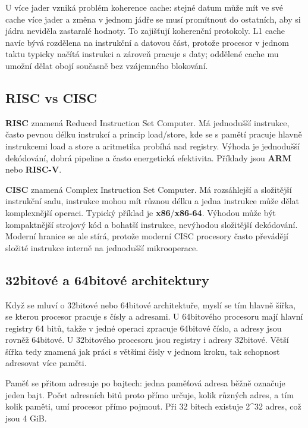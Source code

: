 \documentclass[11pt,a4paper]{article}
\begin{document}
U více jader vzniká problém koherence cache: stejné datum může mít ve své cache více jader a změna v jednom jádře se musí promítnout do ostatních, aby si jádra neviděla zastaralé hodnoty. To zajišťují koherenční protokoly. L1 cache navíc bývá rozdělena na instrukční a datovou část, protože procesor v jednom taktu typicky načítá instrukci a zároveň pracuje s daty; oddělené cache mu umožní dělat obojí současně bez vzájemného blokování.

\subsection*{RISC vs CISC}

\textbf{RISC} znamená Reduced Instruction Set Computer. Má jednodušší instrukce, často pevnou délku instrukcí a princip load/store, kde se s pamětí pracuje hlavně instrukcemi load a store a aritmetika probíhá nad registry. Výhoda je jednodušší dekódování, dobrá pipeline a často energetická efektivita. Příklady jsou \textbf{ARM} nebo \textbf{RISC-V}.

\textbf{CISC} znamená Complex Instruction Set Computer. Má rozsáhlejší a složitější instrukční sadu, instrukce mohou mít různou délku a jedna instrukce může dělat komplexnější operaci. Typický příklad je \textbf{x86}/\textbf{x86-64}. Výhodou může být kompaktnější strojový kód a bohatší instrukce, nevýhodou složitější dekódování. Moderní hranice se ale stírá, protože moderní CISC procesory často převádějí složité instrukce interně na jednodušší mikrooperace.

\subsection*{32bitové a 64bitové architektury}

Když se mluví o 32bitové nebo 64bitové architektuře, myslí se tím hlavně šířka, se kterou procesor pracuje s čísly a adresami. U 64bitového procesoru mají hlavní registry 64 bitů, takže v jedné operaci zpracuje 64bitové číslo, a adresy jsou rovněž 64bitové. U 32bitového procesoru jsou registry i adresy 32bitové. Větší šířka tedy znamená jak práci s většími čísly v jednom kroku, tak schopnost adresovat více paměti.

Paměť se přitom adresuje po bajtech: jedna paměťová adresa běžně označuje jeden bajt. Počet adresních bitů proto přímo určuje, kolik různých adres, a tím kolik paměti, umí procesor přímo pojmout. Při 32 bitech existuje 2\textasciicircum{}32 adres, což jsou 4 GiB.
\end{document}
